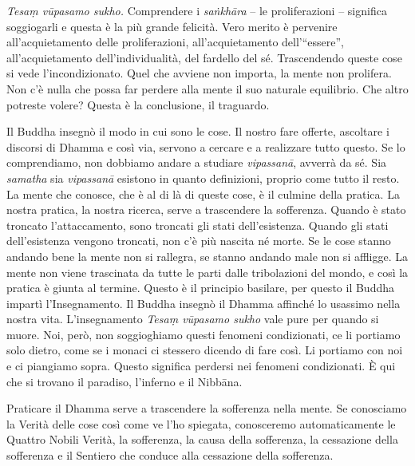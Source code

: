 \emph{Tesaṃ vūpasamo sukho.} Comprendere i \emph{saṅkhāra} -- le
proliferazioni -- significa soggiogarli e questa è la più grande
felicità. Vero merito è pervenire all'acquietamento delle
proliferazioni, all'acquietamento dell'``essere'', all'acquietamento
dell'individualità, del fardello del sé. Trascendendo queste cose si
vede l'incondizionato. Quel che avviene non importa, la mente non
prolifera. Non c'è nulla che possa far perdere alla mente il suo
naturale equilibrio. Che altro potreste volere? Questa è la conclusione,
il traguardo.

Il Buddha insegnò il modo in cui sono le cose. Il nostro fare offerte,
ascoltare i discorsi di Dhamma e così via, servono a cercare e a
realizzare tutto questo. Se lo comprendiamo, non dobbiamo andare a
studiare \emph{vipassanā}, avverrà da sé. Sia \emph{samatha} sia
\emph{vipassanā} esistono in quanto definizioni, proprio come tutto il
resto. La mente che conosce, che è al di là di queste cose, è il culmine
della pratica. La nostra pratica, la nostra ricerca, serve a trascendere
la sofferenza. Quando è stato troncato l'attaccamento, sono troncati gli
stati dell'esistenza. Quando gli stati dell'esistenza vengono troncati,
non c'è più nascita né morte. Se le cose stanno andando bene la mente
non si rallegra, se stanno andando male non si affligge. La mente non
viene trascinata da tutte le parti dalle tribolazioni del mondo, e così
la pratica è giunta al termine. Questo è il principio basilare, per
questo il Buddha impartì l'Insegnamento. Il Buddha insegnò il Dhamma
affinché lo usassimo nella nostra vita. L'insegnamento \emph{Tesaṃ
vūpasamo sukho} vale pure per quando si muore. Noi, però, non
soggioghiamo questi fenomeni condizionati, ce li portiamo solo dietro,
come se i monaci ci stessero dicendo di fare così. Li portiamo con noi e
ci piangiamo sopra. Questo significa perdersi nei fenomeni condizionati.
È qui che si trovano il paradiso, l'inferno e il Nibbāna.

Praticare il Dhamma serve a trascendere la sofferenza nella mente. Se
conosciamo la Verità delle cose così come ve l'ho spiegata, conosceremo
automaticamente le Quattro Nobili Verità, la sofferenza, la causa della
sofferenza, la cessazione della sofferenza e il Sentiero che conduce
alla cessazione della sofferenza.

